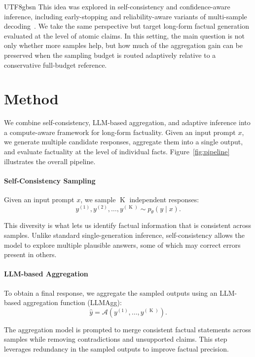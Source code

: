\documentclass[11pt]{article}
\begin{document}
\begin{CJK*}{UTF8}{gbsn}
This idea was explored in self-consistency and confidence-aware inference, including early-stopping and reliability-aware variants of multi-sample decoding~\citep{taubenfeld2025confidence, reasc, marina-etal-2026-boosting}. We take the same perspective but target long-form factual generation evaluated at the level of atomic claims. In this setting, the main question is not only whether more samples help, but how much of the aggregation gain can be preserved when the sampling budget is routed adaptively relative to a conservative full-budget reference.

\section{Method}

We combine self-consistency, LLM-based aggregation, and adaptive inference into a compute-aware framework for long-form factuality. Given an input prompt $x$, we generate multiple candidate responses, aggregate them into a single output, and evaluate factuality at the level of individual facts. Figure~\ref{fig:pipeline} illustrates the overall pipeline.

\paragraph{Self-Consistency Sampling}

Given an input prompt $x$, we sample $\operatorname{K}$ independent responses:
\[
y^{(1)}, y^{(2)}, \dots, y^{(\operatorname{K})} \sim p_\theta(y \mid x).
\]

This diversity is what lets us identify factual information that is consistent across samples. Unlike standard single-generation inference, self-consistency allows the model to explore multiple plausible answers, some of which may correct errors present in others.

\paragraph{LLM-based Aggregation}

To obtain a final response, we aggregate the sampled outputs using an LLM-based aggregation function (LLMAgg):
\[
\hat{y} = \mathcal{A}(y^{(1)}, \dots, y^{(\operatorname{K})}).
\]

The aggregation model is prompted to merge consistent factual statements across samples while removing contradictions and unsupported claims. This step leverages redundancy in the sampled outputs to improve factual precision.


\end{CJK*}
\end{document}
